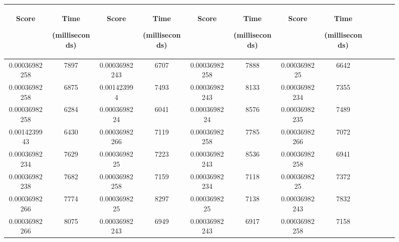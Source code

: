 \begin{figure}[h]
  \centering
  \begin{tabular}{|c|c|c|c|c|c|c|c|c|c|c|c|} 
  \midrule
 \begin{sideways}Score\end{sideways}& \begin{sideways}Time\end{sideways} \begin{sideways} (milliseconds)\end{sideways}& \begin{sideways}Score\end{sideways}& \begin{sideways}Time\end{sideways}  \begin{sideways}(milliseconds)\end{sideways}& \begin{sideways}Score\end{sideways}& \begin{sideways}Time\end{sideways}  \begin{sideways}(milliseconds)\end{sideways}& \begin{sideways}Score\end{sideways}& \begin{sideways}Time\end{sideways}  \begin{sideways} (milliseconds)\end{sideways}\\
\midrule
0.00036982258&7897&0.00036982243&6707&0.00036982258&7888&0.0003698225&6642\\
\midrule
0.00036982258&6875&0.001423994&7493&0.00036982243&8133&0.00036982234&7355\\
\midrule
0.00036982258&6284&0.0003698224&6041&0.0003698224&8576&0.00036982235&7489\\
\midrule
0.0014239943&6430&0.00036982266&7119&0.00036982258&7785&0.00036982266&7072\\
\midrule
0.00036982234&7629&0.0003698225&7223&0.00036982243&8536&0.00036982258&6941\\
\midrule
0.00036982238&7682&0.00036982258&7159&0.00036982234&7118&0.0003698225&7372\\
\midrule
0.00036982266&7774&0.0003698225&8297&0.0003698225&7138&0.00036982243&7832\\
\midrule
0.00036982266&8075&0.00036982243&6949&0.00036982243&6917&0.00036982258&7158\\

\end{tabular}
\end{figure}
